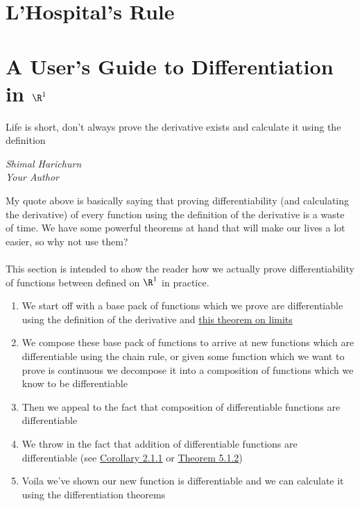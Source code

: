 	
	\section{L'Hospital's Rule}
	
\section{A User's Guide to Differentiation in $\R^1$}

\epigraph{Life is short, don't always prove the derivative exists and calculate it using the definition}{\textit{Shimal Harichurn \\ Your Author}}

 My quote above is basically saying that proving differentiability (and calculating the derivative) of every function using the definition of the derivative is a waste of time. We have some powerful theorems at hand that will make our lives a lot easier, so why not use them?  \\ \\ This section is intended to show the reader how we actually prove differentiability of functions between defined on $\R^1$ in practice. 
 
  \begin{enumerate}
  	\item We start off with a base pack of functions which we prove are differentiable using the  definition of the derivative and \hyperlink{limit-useful-thm}{this theorem on limits}
  	\item We compose these base pack of functions to arrive at new functions which are differentiable using the chain rule, or given some function which we want to prove is continuous we decompose it into a composition of functions which we know to be differentiable
  	\item Then we appeal to the fact that composition of differentiable functions are differentiable 
  	\item We throw in the fact that addition of differentiable functions are differentiable (see \hyperlink{operations-cont}{Corollary 2.1.1} or \hyperlink{multi-operations-cont}{Theorem 5.1.2})
  	\item Voila we've shown our new function is differentiable and we can calculate it using the differentiation theorems
  \end{enumerate}
